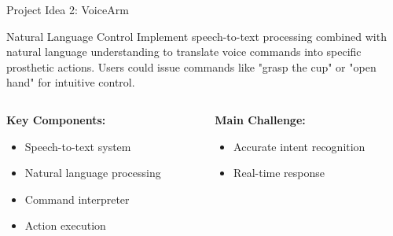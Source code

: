 \documentclass{beamer}
\begin{document}
\begin{frame}{Project Idea 2: VoiceArm}
    \begin{block}{Natural Language Control}
        Implement speech-to-text processing combined with natural language understanding to translate voice commands into specific prosthetic actions. Users could issue commands like "grasp the cup" or "open hand" for intuitive control.
    \end{block}

    \vspace{0.5cm}

    \begin{columns}[T]
        \begin{column}{0.5\textwidth}
            \textbf{Key Components:}
            \begin{itemize}
                \item Speech-to-text system
                \item Natural language processing
                \item Command interpreter
                \item Action execution
            \end{itemize}
        \end{column}

        \begin{column}{0.5\textwidth}
            \textbf{Main Challenge:}
            \begin{itemize}
                \item Accurate intent recognition
                \item Real-time response
            \end{itemize}
        \end{column}
    \end{columns}
\end{frame}
\end{document}
